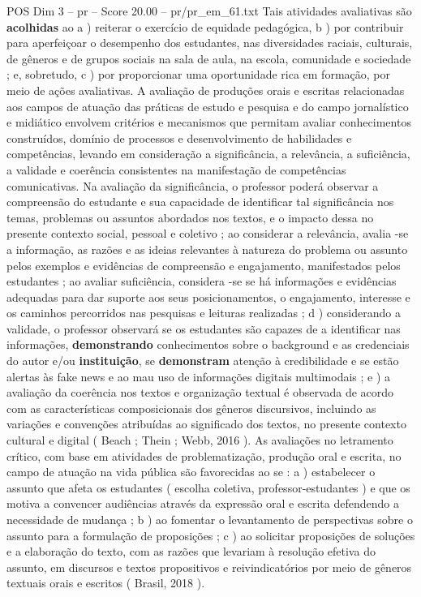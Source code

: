 \begin{textsample}{POS Dim 3 – pr – Score 20.00 – pr/pr\_em\_61.txt}
Tais atividades avaliativas são \textbf{acolhidas} ao a ) reiterar o exercício de equidade pedagógica, b ) por contribuir para aperfeiçoar o desempenho dos estudantes, nas diversidades raciais, culturais, de gêneros e de grupos sociais na sala de aula, na escola, comunidade e sociedade ; e, sobretudo, c ) por proporcionar uma oportunidade rica em formação, por meio de ações avaliativas.
A avaliação de produções orais e escritas relacionadas aos campos de atuação das práticas de estudo e pesquisa e do campo jornalístico e midiático envolvem critérios e mecanismos que permitam avaliar conhecimentos construídos, domínio de processos e desenvolvimento de habilidades e competências, levando em consideração a significância, a relevância, a suficiência, a validade e coerência consistentes na manifestação de competências comunicativas.
Na avaliação da significância, o professor poderá observar a compreensão do estudante e sua capacidade de identificar tal significância nos temas, problemas ou assuntos abordados nos textos, e o impacto dessa no presente contexto social, pessoal e coletivo ; ao considerar a relevância, avalia -se a informação, as razões e as ideias relevantes à natureza do problema ou assunto pelos exemplos e evidências de compreensão e engajamento, manifestados pelos estudantes ; ao avaliar suficiência, considera -se se há informações e evidências adequadas para dar suporte aos seus posicionamentos, o engajamento, interesse e os caminhos percorridos nas pesquisas e leituras realizadas ; d ) considerando a validade, o professor observará se os estudantes são capazes de a identificar nas informações, \textbf{demonstrando} conhecimentos sobre o background e as credenciais do autor e/ou \textbf{instituição}, se \textbf{demonstram} atenção à credibilidade e se estão alertas às fake news e ao mau uso de informações digitais multimodais ; e ) a avaliação da coerência nos textos e organização textual é observada de acordo com as características composicionais dos gêneros discursivos, incluindo as variações e convenções atribuídas ao significado dos textos, no presente contexto cultural e digital ( Beach ; Thein ; Webb, 2016 ).
As avaliações no letramento crítico, com base em atividades de problematização, produção oral e escrita, no campo de atuação na vida pública são favorecidas ao se : a ) estabelecer o assunto que afeta os estudantes ( escolha coletiva, professor-estudantes ) e que os motiva a convencer audiências através da expressão oral e escrita defendendo a necessidade de mudança ; b ) ao fomentar o levantamento de perspectivas sobre o assunto para a formulação de proposições ; c ) ao solicitar proposições de soluções e a elaboração do texto, com as razões que levariam à resolução efetiva do assunto, em discursos e textos propositivos e reivindicatórios por meio de gêneros textuais orais e escritos ( Brasil, 2018 ).

\end{textsample}
